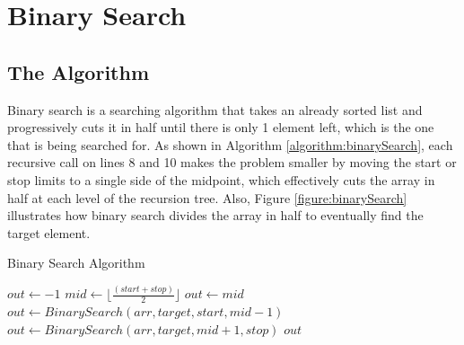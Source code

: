 \documentclass[letterpaper, 10pt,DIV=13]{scrartcl}
\numberwithin{equation}{section} %
\numberwithin{figure}{section} %
\numberwithin{table}{section} %
\begin{document}
\section{Binary Search}
\subsection{The Algorithm}\label{binarySearch}
Binary search is a searching algorithm that takes an already sorted list and progressively cuts it in half until there is only 1 element left, which is the one that is being searched for. As shown in Algorithm \ref{algorithm:binarySearch}, each recursive call on lines 8 and 10 makes the problem smaller by moving the start or stop limits to a single side of the midpoint, which effectively cuts the array in half at each level of the recursion tree. Also, Figure \ref{figure:binarySearch} illustrates how binary search divides the array in half to eventually find the target element.

\begin{algorithm}
  \caption{Binary Search Algorithm}
  \label{algorithm:binarySearch}
  \begin{algorithmic}[1]
        \State $out \gets -1$ 
         
          \State $mid \gets \lfloor\frac{(start + stop)}{2}\rfloor$ 
            \State $out \gets mid$ 
           
            \State $out \gets BinarySearch(arr, target, start, mid - 1)$ 
          \Else {}
            \State $out \gets BinarySearch(arr, target, mid + 1, stop)$ 
          \EndIf
        \EndIf
        \State \Return $out$
      \EndProcedure
  \end{algorithmic}
\end{algorithm}
\end{document}
